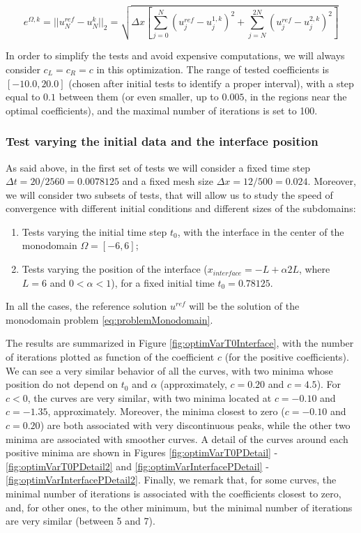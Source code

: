 \begin{equation*}
	e^{\Omega,k} = ||u^{ref}_N - u^{k}_N||_2 = \sqrt{\Delta x \left[ \sum_{j=0}^N{(u^{ref}_j - u^{1,k}_j)^2 } + \sum_{j=N}^{2N}{(u^{ref}_j - u^{2,k}_j)^2 } \right] }
\end{equation*}
 
\indent In order to simplify the tests and avoid expensive computations, we will always consider $c_L = c_R = c$ in this optimization. The range of tested coefficients is $[-10.0, 20.0]$ (chosen after initial tests to identify a proper interval), with a step equal to  $0.1$ between them (or even smaller, up to $0.005$, in the regions near the optimal coefficients), and the maximal number of iterations is set to 100.

\subsubsection{Test varying the initial data and the interface position}

\indent As said above, in the first set of tests we will consider a fixed time step $\Delta t = 20/2560 = 0.0078125$ and a fixed mesh size $\Delta x = 12/500 = 0.024$. Moreover, we will consider two subsets of tests, that will allow us to study the speed of convergence with different initial conditions and different sizes of the subdomains:

\begin{enumerate}
	\item Tests varying the initial time step $t_0$, with the interface in the center of the monodomain $\Omega = [-6,6]$;
	\item Tests varying the position of the interface ($x_{interface} = -L + \alpha 2L$, where $L = 6$ and $0 < \alpha < 1$), for a fixed initial time $t_0 = 0.78125$.
\end{enumerate}

\indent In all the cases, the reference solution $u^{ref}$ will be the solution of the monodomain problem \eqref{eq:problemMonodomain}.

\indent The results are summarized in Figure \ref{fig:optimVarT0Interface}, with the number of iterations plotted as function of the coefficient $c$ (for the positive coefficients). We can see a very similar behavior of all the curves, with two minima whose position do not depend on $t_0$ and $\alpha$ (approximately, $c = 0.20$ and $c=4.5$). For $c<0$, the curves are very similar, with two minima located at $c = -0.10$ and $c = -1.35$, approximately. Moreover, the minima closest to zero ($c=-0.10$ and $c = 0.20$) are both associated with very discontinuous peaks, while the other two minima are associated with smoother curves. A detail of the curves around each positive minima are shown in Figures \ref{fig:optimVarT0PDetail} - \ref{fig:optimVarT0PDetail2} and \ref{fig:optimVarInterfacePDetail} - \ref{fig:optimVarInterfacePDetail2}. Finally, we remark that, for some curves, the minimal number of iterations is associated with the coefficients closest to zero, and, for other ones, to the other minimum, but the minimal number of iterations are very similar (between 5 and 7).

